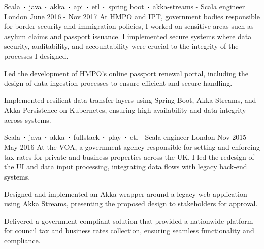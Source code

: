 \begin{cventries}
    \cventry
    {Scala$\sqbig$java$\sqbig$akka$\sqbig$api$\sqbig$etl$\sqbig$spring boot$\sqbig$akka-streams}
    { - Scala engineer}
    {London}
    {June 2016 - Nov 2017}
    {At HMPO and IPT, government bodies responsible for border security and immigration policies, I worked on sensitive areas such as asylum claims and passport issuance. I implemented secure systems where data security, auditability, and accountability were crucial to the integrity of the processes I designed.}
    {
        \begin{cvitems}
            \item{Led the development of HMPO’s online passport renewal portal, including the design of data ingestion processes to ensure efficient and secure handling.}
            \item{Implemented resilient data transfer layers using Spring Boot, Akka Streams, and Akka Persistence on Kubernetes, ensuring high availability and data integrity across systems.}
        \end{cvitems}
    }

    \cventry
    {Scala$\sqbig$java$\sqbig$akka$\sqbig$fullstack$\sqbig$play$\sqbig$etl}
    { - Scala engineer}
    {London}
    {Nov 2015 - May 2016}
    {At the VOA, a government agency responsible for setting and enforcing tax rates for private and business properties across the UK, I led the redesign of the UI and data input processing, integrating data flows with legacy back-end systems.}
    {
        \begin{cvitems}
            \item{Designed and implemented an Akka wrapper around a legacy web application using Akka Streams, presenting the proposed design to stakeholders for approval.}
            \item{Delivered a government-compliant solution that provided a nationwide platform for council tax and business rates collection, ensuring seamless functionality and compliance.}
        \end{cvitems}
    }


\end{cventries}
